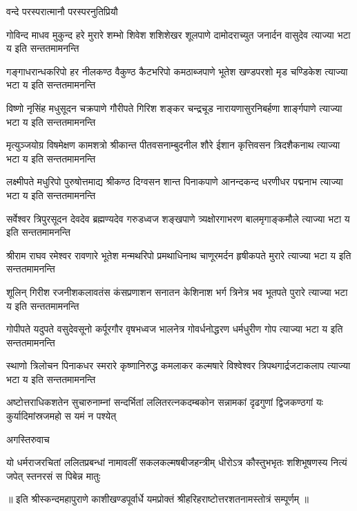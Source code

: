 
{वन्दे परस्परात्मानौ परस्परनुतिप्रियौ}

\fourlineindentedshloka
{गोविन्द माधव मुकुन्द हरे मुरारे}
{शम्भो शिवेश शशिशेखर शूलपाणे}
{दामोदराच्युत जनार्दन वासुदेव}
{त्याज्या भटा य इति सन्ततमामनन्ति}

\fourlineindentedshloka
{गङ्गाधरान्धकरिपो हर नीलकण्ठ}
{वैकुण्ठ कैटभरिपो कमठाब्जपाणे}
{भूतेश खण्डपरशो मृड चण्डिकेश}
{त्याज्या भटा य इति सन्ततमामनन्ति}

\fourlineindentedshloka
{विष्णो नृसिंह मधुसूदन चक्रपाणे}
{गौरीपते गिरिश शङ्कर चन्द्रचूड}
{नारायणासुरनिबर्हणा शार्ङ्गपाणे}
{त्याज्या भटा य इति सन्ततमामनन्ति}

\fourlineindentedshloka
{मृत्युञ्जयोग्र विषमेक्षण कामशत्रो}
{श्रीकान्त पीतवसनाम्बुदनील शौरे}
{ईशान कृत्तिवसन त्रिदशैकनाथ}
{त्याज्या भटा य इति सन्ततमामनन्ति}

\fourlineindentedshloka
{लक्ष्मीपते मधुरिपो पुरुषोत्तमाद्य}
{श्रीकण्ठ दिग्वसन शान्त पिनाकपाणे}
{आनन्दकन्द धरणीधर पद्मनाभ}
{त्याज्या भटा य इति सन्ततमामनन्ति}

\fourlineindentedshloka
{सर्वेश्वर त्रिपुरसूदन देवदेव}
{ब्रह्मण्यदेव गरुडध्वज शङ्खपाणे}
{त्र्यक्षोरगाभरण बालमृगाङ्कमौले}
{त्याज्या भटा य इति सन्ततमामनन्ति}

\fourlineindentedshloka
{श्रीराम राघव रमेश्वर रावणारे}
{भूतेश मन्मथरिपो प्रमथाधिनाथ}
{चाणूरमर्दन हृषीकपते मुरारे}
{त्याज्या भटा य इति सन्ततमामनन्ति}

\fourlineindentedshloka
{शूलिन् गिरीश रजनीशकलावतंस}
{कंसप्रणाशन सनातन केशिनाश}
{भर्ग त्रिनेत्र भव भूतपते पुरारे}
{त्याज्या भटा य इति सन्ततमामनन्ति}

\fourlineindentedshloka
{गोपीपते यदुपते वसुदेवसूनो}
{कर्पूरगौर वृषभध्वज भालनेत्र}
{गोवर्धनोद्धरण धर्मधुरीण गोप}
{त्याज्या भटा य इति सन्ततमामनन्ति}

\fourlineindentedshloka
{स्थाणो त्रिलोचन पिनाकधर स्मरारे}
{कृष्णानिरुद्ध कमलाकर कल्मषारे}
{विश्वेश्वर त्रिपथगार्द्रजटाकलाप}
{त्याज्या भटा य इति सन्ततमामनन्ति}

\fourlineindentedshloka
{अष्टोत्तराधिकशतेन सुचारुनाम्नां}
{सन्दर्भितां ललितरत्नकदम्बकोन}
{सन्नामकां दृढगुणां द्विजकण्ठगां यः}
{कुर्यादिमांस्रजमहो स यमं न पश्येत्}

{अगस्तिरुवाच}

\fourlineindentedshloka
{यो धर्मराजरचितां ललितप्रबन्धां}
{नामावलीं सकलकल्मषबीजहन्त्रीम्}
{धीरोऽत्र कौस्तुभभृतः शशिभूषणस्य}
{नित्यं जपेत् स्तनरसं स पिबेन्न मातुः}

{॥ इति श्रीस्कन्दमहापुराणे काशीखण्डपूर्वार्धे यमप्रोक्तं श्रीहरिहराष्टोत्तरशतनामस्तोत्रं सम्पूर्णम् ॥}
